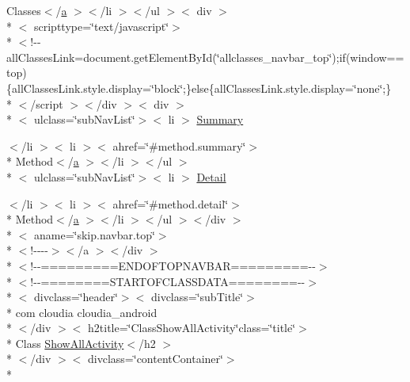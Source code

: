 \begin{DoxyCompactItemize}
\item 
Classes$<$/\hyperlink{style_8css_a5e8981582017bb8b84c21f148345d1f7}{a} $>$$<$/li $>$$<$/ul $>$$<$ div $>$\\*
$<$ scripttype=\char`\"{}text/javascript\char`\"{}$>$\\*
$<$!-\/-\/all\-Classes\-Link=document.\-get\-Element\-By\-Id(\char`\"{}allclasses\-\_\-navbar\-\_\-top\char`\"{});if(window==top)\{all\-Classes\-Link.\-style.\-display=\char`\"{}block\char`\"{};\}else\{all\-Classes\-Link.\-style.\-display=\char`\"{}none\char`\"{};\}\\*
$<$/script $>$$<$/div $>$$<$ div $>$\\*
$<$ ulclass=\char`\"{}sub\-Nav\-List\char`\"{}$>$$<$ li $>$ \hyperlink{_show_all_activity_8html_a6f9ab45abc9b0679dc1b132fbacfc681}{Summary}
\item 
$<$/li $>$$<$ li $>$$<$ ahref=\char`\"{}\#method.\-summary\char`\"{}$>$\\*
 Method$<$/\hyperlink{style_8css_a5e8981582017bb8b84c21f148345d1f7}{a} $>$$<$/li $>$$<$/ul $>$\\*
$<$ ulclass=\char`\"{}sub\-Nav\-List\char`\"{}$>$$<$ li $>$ \hyperlink{_show_all_activity_8html_a1e04b5ec07bcd5281e26dcd40e5b3a94}{Detail}
\item 
$<$/li $>$$<$ li $>$$<$ ahref=\char`\"{}\#method.\-detail\char`\"{}$>$\\*
 Method$<$/\hyperlink{style_8css_a5e8981582017bb8b84c21f148345d1f7}{a} $>$$<$/li $>$$<$/ul $>$$<$/div $>$\\*
$<$ aname=\char`\"{}skip.\-navbar.\-top\char`\"{}$>$\\*
$<$!-\/-\/-\/-\/$>$$<$/a $>$$<$/div $>$\\*
$<$!-\/-\/=========E\-N\-D\-O\-F\-T\-O\-P\-N\-A\-V\-B\-A\-R=========-\/-\/$>$\\*
$<$!-\/-\/========S\-T\-A\-R\-T\-O\-F\-C\-L\-A\-S\-S\-D\-A\-T\-A========-\/-\/$>$\\*
$<$ divclass=\char`\"{}header\char`\"{}$>$$<$ divclass=\char`\"{}sub\-Title\char`\"{}$>$\\*
 com cloudia cloudia\-\_\-android\\*
$<$/div $>$$<$ h2title=\char`\"{}Class\-Show\-All\-Activity\char`\"{}class=\char`\"{}title\char`\"{}$>$\\*
 Class \hyperlink{index-17_8html_a7d4dd1b0ee92cae8fddf5906ccbbf59b}{Show\-All\-Activity}$<$/h2 $>$\\*
$<$/div $>$$<$ divclass=\char`\"{}content\-Container\char`\"{}$>$\\*
$$
\end{DoxyCompactItemize}
